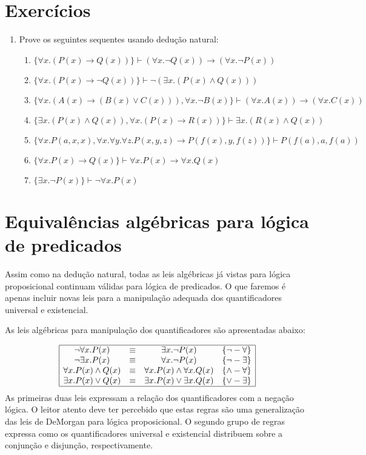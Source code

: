 \section{Exercícios}

\begin{enumerate}
	\item Prove os seguintes sequentes usando dedu\c{c}\~ao natural:
	\begin{enumerate}
		\item $\{\forall x. (P(x)\rightarrow Q(x))\}\vdash(\forall x.\neg Q(x))\rightarrow(\forall x.\neg P(x))$
		\item $\{\forall x. (P(x)\rightarrow \neg Q(x))\}\vdash\neg (\exists x. (P(x)\land Q(x)))$
		\item $\{\forall x.(A(x)\rightarrow (B(x)\lor C(x))),\forall x.\neg B(x)\}\vdash(\forall x. A(x))\rightarrow
		       (\forall x. C(x))$
		\item $\{\exists x. (P(x)\land Q(x)), \forall x. (P(x)\rightarrow R(x))\}\vdash\exists x.(R(x)\land Q(x))$
		\item $\{\forall x. P(a,x,x), \forall x.\forall
                  y.\forall z. P(x,y,z)\rightarrow
                  P(f(x),y,f(z))\}\vdash P(f(a),a,f(a))$
           \item $\{\forall x. P(x) \rightarrow Q(x)\} \vdash \forall x. P(x) \rightarrow \forall x. Q(x)$
           \item $\{\exists x. \neg P(x) \}\vdash \neg \forall x. P(x)$
	\end{enumerate}
\end{enumerate}

\section{Equivalências algébricas para lógica de predicados}

Assim como na dedução natural, todas as leis algébricas já vistas para
lógica proposicional continuam válidas para lógica de predicados. O
que faremos é apenas incluir novas leis para a manipulação adequada
dos quantificadores universal e existencial.

As leis algébricas para manipulação dos quantificadores são
apresentadas abaixo:

\[
\begin{array}{|cccl|}
\hline
\neg \forall x. P(x) & \equiv & \exists x. \neg P(x) &
\{\neg-\forall\}\\
\neg \exists x. P(x) & \equiv & \forall x. \neg P(x) &
\{\neg-\exists\}\\
\forall x. P(x) \land Q(x) & \equiv & \forall x. P(x) \land \forall
x. Q(x) & \{\land-\forall\} \\
\exists x. P(x) \lor Q(x) & \equiv & \exists x. P(x) \lor \exists
x. Q(x) & \{\lor-\exists\} \\ \hline
\end{array}
\]
As primeiras duas leis expressam a relação dos quantificadores com a
negação lógica. O leitor atento deve ter percebido que estas regras
são uma generalização das leis de DeMorgan para lógica proposicional.
O segundo grupo de regras expressa como os quantificadores universal e
existencial distribuem sobre a conjunção e disjunção, respectivamente.

